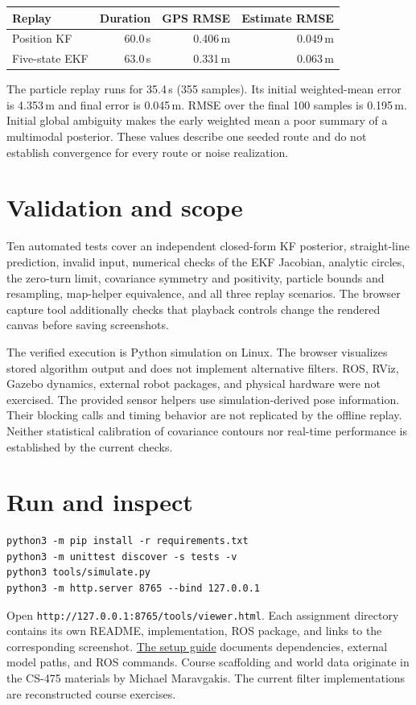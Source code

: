 \documentclass[10pt,a4paper]{article}
\begin{document}
\begin{center}
\begin{tabular}{@{}lrrr@{}}
\toprule
Replay & Duration & GPS RMSE & Estimate RMSE\\
\midrule
Position KF & 60.0\,s & 0.406\,m & 0.049\,m\\
Five-state EKF & 63.0\,s & 0.331\,m & 0.063\,m\\
\bottomrule
\end{tabular}
\end{center}
The particle replay runs for 35.4\,s (355 samples). Its initial weighted-mean error is 4.353\,m and final error is 0.045\,m. RMSE over the final 100 samples is 0.195\,m. Initial global ambiguity makes the early weighted mean a poor summary of a multimodal posterior. These values describe one seeded route and do not establish convergence for every route or noise realization.

\section*{Validation and scope}
Ten automated tests cover an independent closed-form KF posterior, straight-line prediction, invalid input, numerical checks of the EKF Jacobian, analytic circles, the zero-turn limit, covariance symmetry and positivity, particle bounds and resampling, map-helper equivalence, and all three replay scenarios. The browser capture tool additionally checks that playback controls change the rendered canvas before saving screenshots.

The verified execution is Python simulation on Linux. The browser visualizes stored algorithm output and does not implement alternative filters. ROS, RViz, Gazebo dynamics, external robot packages, and physical hardware were not exercised. The provided sensor helpers use simulation-derived pose information. Their blocking calls and timing behavior are not replicated by the offline replay. Neither statistical calibration of covariance contours nor real-time performance is established by the current checks.

\section*{Run and inspect}
\begin{verbatim}
python3 -m pip install -r requirements.txt
python3 -m unittest discover -s tests -v
python3 tools/simulate.py
python3 -m http.server 8765 --bind 127.0.0.1
\end{verbatim}
Open \texttt{http://127.0.0.1:8765/tools/viewer.html}. Each assignment directory contains its own README, implementation, ROS package, and links to the corresponding screenshot. \href{https://github.com/mitsosasim/robotics_uoc/blob/main/docs/SETUP.md}{The setup guide} documents dependencies, external model paths, and ROS commands. Course scaffolding and world data originate in the CS-475 materials by Michael Maravgakis. The current filter implementations are reconstructed course exercises.
\end{document}
